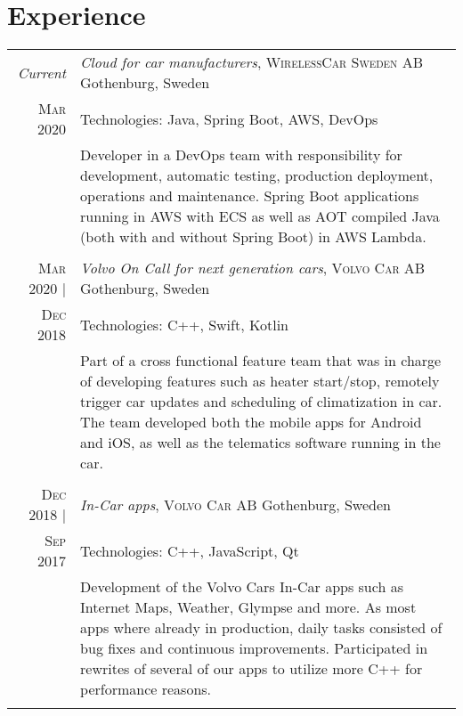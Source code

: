 \documentclass[a4paper,10pt]{scrartcl} %
\begin{document}
\section{Experience}
\begin{tabular}{r|p{15cm}}


\emph{Current} 	                    & \emph{Cloud for car manufacturers}, \textsc{WirelessCar Sweden AB} \hfill Gothenburg, Sweden \\
\textsc{Mar 2020}                   & \footnotesize{Technologies: Java, Spring Boot, AWS, DevOps} \\
\phantom{abcdefghijklm}             & \footnotesize{Developer in a DevOps team with responsibility for development, automatic testing, production deployment, operations and maintenance. Spring Boot applications running in AWS with ECS as well as AOT compiled Java (both with and without Spring Boot) in AWS Lambda.} \\
\multicolumn{2}{c}{} \\


\textsc{Mar 2020} |	                & \emph{Volvo On Call for next generation cars}, \textsc{Volvo Car AB} \hfill Gothenburg, Sweden \\
\textsc{Dec 2018}                   & \footnotesize{Technologies: C++, Swift, Kotlin} \\
\phantom{abcdefghijklm}             & \footnotesize{
Part of a cross functional feature team that was in charge of developing features such as heater start/stop, remotely trigger car updates and scheduling of climatization in car. The team developed both the mobile apps for Android and iOS, as well as the telematics software running in the car. } \\
\multicolumn{2}{c}{} \\


\textsc{Dec 2018} | 	            & \emph{In-Car apps}, \textsc{Volvo Car AB} \hfill Gothenburg, Sweden \\
\textsc{Sep 2017}                   & \footnotesize{Technologies: C++, JavaScript, Qt} \\
\phantom{abcdefghijklm}             & \footnotesize{
Development of the Volvo Cars In-Car apps such as Internet Maps, Weather, Glympse and more. As most apps where already in production, daily tasks consisted of bug fixes and continuous improvements. Participated in rewrites of several of our apps to utilize more C++ for performance reasons. } \\
\multicolumn{2}{c}{} \\


\end{tabular}
\end{document}
